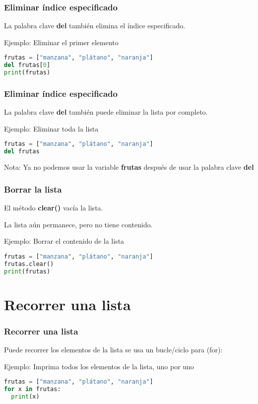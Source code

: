 \begin{frame}[fragile]
  \frametitle{Eliminar índice especificado}

  La palabra clave \textbf{del} también elimina el índice especificado.

  \vspace{\baselineskip}
  Ejemplo: Eliminar el primer elemento
  \begin{lstlisting}[language=Python]
frutas = ["manzana", "plátano", "naranja"]
del frutas[0]
print(frutas)
  \end{lstlisting}
\end{frame}

\begin{frame}[fragile]
  \frametitle{Eliminar índice especificado}

  La palabra clave \textbf{del} también puede eliminar la lista por completo.

  \vspace{\baselineskip}
  Ejemplo: Eliminar toda la lista
  \begin{lstlisting}[language=Python]
frutas = ["manzana", "plátano", "naranja"]
del frutas
  \end{lstlisting}

  \begin{block}{Nota:}
    Ya no podemos usar la variable \textbf{frutas} después de usar
    la palabra clave \textbf{del}
  \end{block}
\end{frame}

\begin{frame}[fragile]
  \frametitle{Borrar la lista}

  El método \textbf{clear()} vacía la lista.

  \vspace{\baselineskip}
  La lista aún permanece, pero no tiene contenido.

  \vspace{\baselineskip}
  Ejemplo: Borrar el contenido de la lista
  \begin{lstlisting}[language=Python]
frutas = ["manzana", "plátano", "naranja"]
frutas.clear()
print(frutas)
  \end{lstlisting}
\end{frame}

\section{Recorrer una lista}

\begin{frame}[fragile]
  \frametitle{Recorrer una lista}

  Puede recorrer los elementos de la lista se usa un
  bucle/ciclo para (for):

  \vspace{\baselineskip}
  Ejemplo: Imprima todos los elementos de la lista, uno por uno
  \begin{lstlisting}[language=Python]
frutas = ["manzana", "plátano", "naranja"]
for x in frutas:
  print(x)
  \end{lstlisting}
\end{frame}

